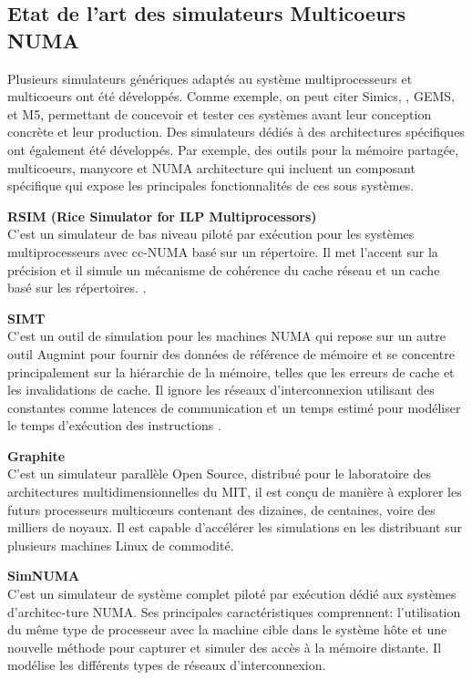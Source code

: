 \subsection{Etat de l'art des simulateurs Multicoeurs NUMA}
%
Plusieurs simulateurs génériques adaptés au système multiprocesseurs et multicoeurs ont été développés. Comme exemple, on peut citer 
Simics, \cite{sim11}, 
GEMS, \cite{GEM12} et 
M5, \cite{M5S13} 
permettant de concevoir et tester ces systèmes avant leur conception concrète et leur production. Des simulateurs dédiés à des architectures spécifiques ont également été développés. Par exemple, des outils pour la mémoire partagée, multicoeurs, manycore et NUMA architecture qui incluent un composant spécifique qui expose les principales fonctionnalités de ces sous systèmes.%

\textbf{RSIM (Rice Simulator for ILP Multiprocessors)}\\  
C'est un simulateur de bas niveau piloté par exécution pour les systèmes multiprocesseurs avec cc-NUMA basé sur un répertoire. 
Il met l'accent sur la précision et il simule un mécanisme de cohérence du cache réseau et un cache basé sur les répertoires. \cite{RSI14, RSI15}.

\textbf{SIMT }\\ %
C'est un outil de simulation pour les machines NUMA qui repose sur un autre outil Augmint \cite{Aug17} 
pour fournir des données de référence de mémoire et se concentre principalement sur la hiérarchie de la mémoire, telles que les erreurs de cache et les invalidations de cache. Il ignore les réseaux d'interconnexion utilisant des constantes comme latences de communication et un temps estimé pour modéliser le temps d'exécution des instructions
\cite{SIM16}.

\textbf{Graphite}\\  %
C'est un simulateur parallèle Open Source, distribué pour le laboratoire des architectures multidimensionnelles du MIT, il est conçu de manière à explorer les futurs processeurs multicœurs contenant des dizaines, de centaines, voire des milliers de noyaux. Il est capable d'accélérer les simulations en les distribuant sur plusieurs machines Linux de commodité.
\cite{Gra18}  %

\textbf{SimNUMA }\\ %
C'est un simulateur de système complet piloté par exécution dédié aux systèmes d'architec-ture NUMA. Ses principales caractéristiques comprennent: l'utilisation du même type de processeur avec la machine cible dans le système hôte et une nouvelle méthode pour capturer et simuler des accès à la mémoire distante. Il modélise les  différents types de réseaux d'interconnexion. \cite{Sim20}

